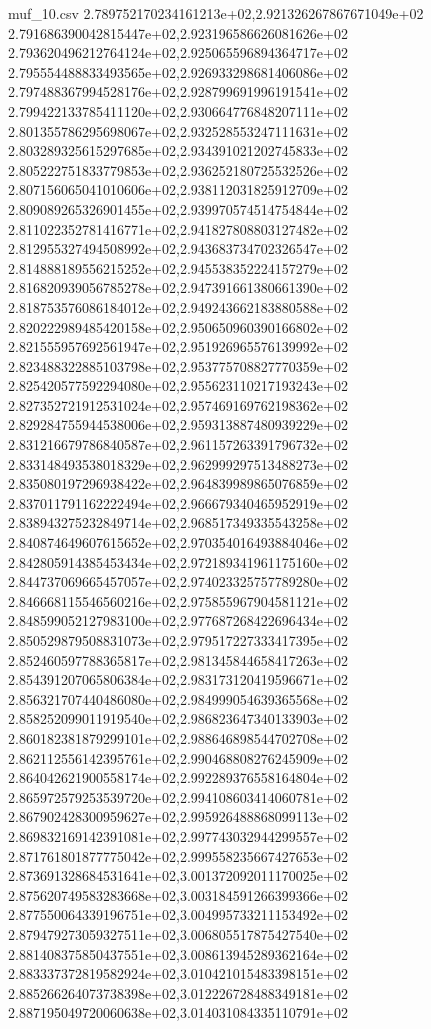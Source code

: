 \begin{filecontents*}{muf_10.csv}
2.789752170234161213e+02,2.921326267867671049e+02
2.791686390042815447e+02,2.923196586626081626e+02
2.793620496212764124e+02,2.925065596894364717e+02
2.795554488833493565e+02,2.926933298681406086e+02
2.797488367994528176e+02,2.928799691996191541e+02
2.799422133785411120e+02,2.930664776848207111e+02
2.801355786295698067e+02,2.932528553247111631e+02
2.803289325615297685e+02,2.934391021202745833e+02
2.805222751833779853e+02,2.936252180725532526e+02
2.807156065041010606e+02,2.938112031825912709e+02
2.809089265326901455e+02,2.939970574514754844e+02
2.811022352781416771e+02,2.941827808803127482e+02
2.812955327494508992e+02,2.943683734702326547e+02
2.814888189556215252e+02,2.945538352224157279e+02
2.816820939056785278e+02,2.947391661380661390e+02
2.818753576086184012e+02,2.949243662183880588e+02
2.820222989485420158e+02,2.950650960390166802e+02
2.821555957692561947e+02,2.951926965576139992e+02
2.823488322885103798e+02,2.953775708827770359e+02
2.825420577592294080e+02,2.955623110217193243e+02
2.827352721912531024e+02,2.957469169762198362e+02
2.829284755944538006e+02,2.959313887480939229e+02
2.831216679786840587e+02,2.961157263391796732e+02
2.833148493538018329e+02,2.962999297513488273e+02
2.835080197296938422e+02,2.964839989865076859e+02
2.837011791162222494e+02,2.966679340465952919e+02
2.838943275232849714e+02,2.968517349335543258e+02
2.840874649607615652e+02,2.970354016493884046e+02
2.842805914385453434e+02,2.972189341961175160e+02
2.844737069665457057e+02,2.974023325757789280e+02
2.846668115546560216e+02,2.975855967904581121e+02
2.848599052127983100e+02,2.977687268422696434e+02
2.850529879508831073e+02,2.979517227333417395e+02
2.852460597788365817e+02,2.981345844658417263e+02
2.854391207065806384e+02,2.983173120419596671e+02
2.856321707440486080e+02,2.984999054639365568e+02
2.858252099011919540e+02,2.986823647340133903e+02
2.860182381879299101e+02,2.988646898544702708e+02
2.862112556142395761e+02,2.990468808276245909e+02
2.864042621900558174e+02,2.992289376558164804e+02
2.865972579253539720e+02,2.994108603414060781e+02
2.867902428300959627e+02,2.995926488868099113e+02
2.869832169142391081e+02,2.997743032944299557e+02
2.871761801877775042e+02,2.999558235667427653e+02
2.873691328684531641e+02,3.001372092011170025e+02
2.875620749583283668e+02,3.003184591266399366e+02
2.877550064339196751e+02,3.004995733211153492e+02
2.879479273059327511e+02,3.006805517875427540e+02
2.881408375850437551e+02,3.008613945289362164e+02
2.883337372819582924e+02,3.010421015483398151e+02
2.885266264073738398e+02,3.012226728488349181e+02
2.887195049720060638e+02,3.014031084335110791e+02

\end{filecontents*}

